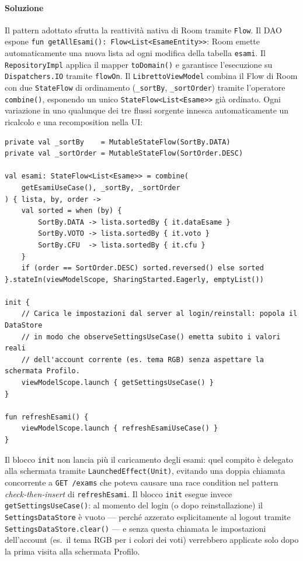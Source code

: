 \documentclass[a4paper,12pt]{report}
\begin{document}
    \paragraph{Soluzione}
    Il pattern adottato sfrutta la reattività nativa di Room tramite \texttt{Flow}.
    Il DAO espone \texttt{fun getAllEsami(): Flow<List<EsameEntity>>}: Room emette
    automaticamente una nuova lista ad ogni modifica della tabella \texttt{esami}.
    Il \texttt{RepositoryImpl} applica il mapper \texttt{toDomain()} e garantisce
    l'esecuzione su \texttt{Dispatchers.IO} tramite \texttt{flowOn}.
    Il \texttt{LibrettoViewModel} combina il Flow di Room con due \texttt{StateFlow}
    di ordinamento (\texttt{\_sortBy}, \texttt{\_sortOrder}) tramite l'operatore
    \texttt{combine()}, esponendo un unico \texttt{StateFlow<List<Esame>>} già ordinato.
    Ogni variazione in uno qualunque dei tre flussi sorgente innesca automaticamente
    un ricalcolo e una recomposition nella UI:

    \begin{lstlisting}
private val _sortBy    = MutableStateFlow(SortBy.DATA)
private val _sortOrder = MutableStateFlow(SortOrder.DESC)

val esami: StateFlow<List<Esame>> = combine(
    getEsamiUseCase(), _sortBy, _sortOrder
) { lista, by, order ->
    val sorted = when (by) {
        SortBy.DATA -> lista.sortedBy { it.dataEsame }
        SortBy.VOTO -> lista.sortedBy { it.voto }
        SortBy.CFU  -> lista.sortedBy { it.cfu }
    }
    if (order == SortOrder.DESC) sorted.reversed() else sorted
}.stateIn(viewModelScope, SharingStarted.Eagerly, emptyList())

init {
    // Carica le impostazioni dal server al login/reinstall: popola il DataStore
    // in modo che observeSettingsUseCase() emetta subito i valori reali
    // dell'account corrente (es. tema RGB) senza aspettare la schermata Profilo.
    viewModelScope.launch { getSettingsUseCase() }
}

fun refreshEsami() {
    viewModelScope.launch { refreshEsamiUseCase() }
}
    \end{lstlisting}

    Il blocco \texttt{init} non lancia più il caricamento degli esami: quel compito
    è delegato alla schermata tramite \texttt{LaunchedEffect(Unit)}, evitando
    una doppia chiamata concorrente a \texttt{GET /exams} che poteva causare
    una race condition nel pattern \emph{check-then-insert} di \texttt{refreshEsami}.
    Il blocco \texttt{init} esegue invece \texttt{getSettingsUseCase()}: al momento
    del login (o dopo reinstallazione) il \texttt{SettingsDataStore} è vuoto ---
    perché azzerato esplicitamente al logout tramite \texttt{SettingsDataStore.clear()} ---
    e senza questa chiamata le impostazioni dell'account (es.\ il tema RGB per i colori dei
    voti) verrebbero applicate solo dopo la prima visita alla schermata Profilo.
\end{document}
